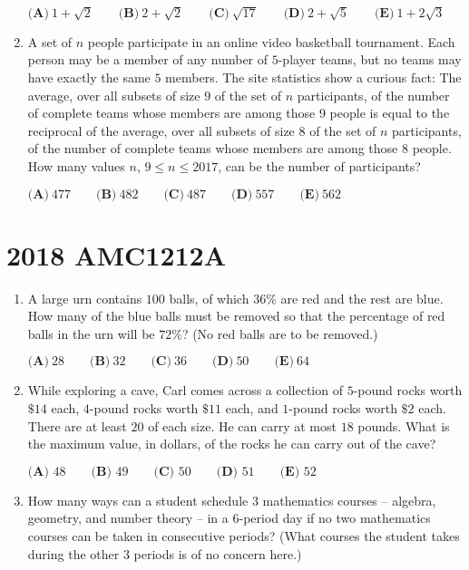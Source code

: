 \documentclass{article}
\begin{document}
\begin{enumerate}[label=\arabic*., itemsep=0.5em]
\(\textbf{(A)}\ 1 + \sqrt{2} \qquad \textbf{(B)}\ 2 + \sqrt{2} \qquad \textbf{(C)}\ \sqrt{17} \qquad \textbf{(D)}\ 2 + \sqrt{5} \qquad\textbf{(E)}\ 1 + 2\sqrt{3}\)\par \vspace{0.5em}\item A set of \(n\) people participate in an online video basketball tournament. Each person may be a member of any number of \(5\)-player teams, but no teams may have exactly the same \(5\) members. The site statistics show a curious fact: The average, over all subsets of size \(9\) of the set of \(n\) participants, of the number of complete teams whose members are among those 9 people is equal to the reciprocal of the average, over all subsets of size \(8\) of the set of \(n\) participants, of the number of complete teams whose members are among those \(8\) people. How many values \(n\), \(9 \leq n \leq 2017\), can be the number of participants?

\(\textbf{(A)}\ 477 \qquad \textbf{(B)}\ 482 \qquad \textbf{(C)}\ 487 \qquad \textbf{(D)}\ 557 \qquad\textbf{(E)}\ 562\)\par \vspace{0.5em}\end{enumerate}\newpage\section*{2018 AMC1212A}\begin{enumerate}[label=\arabic*., itemsep=0.5em]\item A large urn contains \(100\) balls, of which \(36 \%\) are red and the rest are blue. How many of the blue balls must be removed so that the percentage of red balls in the urn will be \(72 \%\)? (No red balls are to be removed.)

\( \textbf{(A)}\ 28 \qquad\textbf{(B)}\  32 \qquad\textbf{(C)}\  36 \qquad\textbf{(D)}\ 
 50 \qquad\textbf{(E)}\ 64 \)\par \vspace{0.5em}\item While exploring a cave, Carl comes across a collection of \(5\)-pound rocks worth \(\$14\) each, \(4\)-pound rocks worth \(\$11\) each, and \(1\)-pound rocks worth \(\$2\) each. There are at least \(20\) of each size. He can carry at most \(18\) pounds. What is the maximum value, in dollars, of the rocks he can carry out of the cave?

\(\textbf{(A) } 48 \qquad \textbf{(B) } 49 \qquad \textbf{(C) } 50 \qquad \textbf{(D) } 51 \qquad \textbf{(E) } 52 \)\par \vspace{0.5em}\item How many ways can a student schedule \(3\) mathematics courses -- algebra, geometry, and number theory -- in a \(6\)-period day if no two mathematics courses can be taken in consecutive periods? (What courses the student takes during the other \(3\) periods is of no concern here.)


\end{enumerate}
\end{document}
